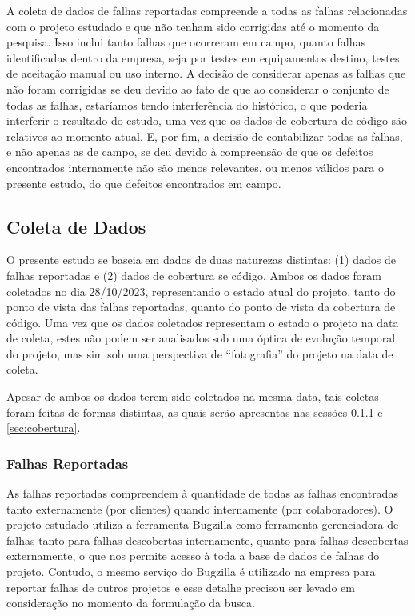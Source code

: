 \documentclass[11.5pt]{article}
\begin{document}
A coleta de dados de falhas reportadas compreende a todas as falhas relacionadas com o projeto
estudado e que não tenham sido corrigidas até o momento da pesquisa.
Isso inclui tanto falhas que ocorreram em campo, quanto falhas identificadas dentro da empresa, seja
por testes em equipamentos destino, testes de aceitação manual ou uso interno.
A decisão de considerar apenas as falhas que não foram corrigidas se deu devido ao fato de que ao
considerar o conjunto de todas as falhas, estaríamos tendo interferência do histórico, o que poderia
interferir o resultado do estudo, uma vez que os dados de cobertura de código são relativos ao
momento atual.
E, por fim, a decisão de contabilizar todas as falhas, e não apenas as de campo, se deu devido à
compreensão de que os defeitos encontrados internamente não são menos relevantes, ou menos válidos
para o presente estudo, do que defeitos encontrados em campo.


\subsection{Coleta de Dados}

O presente estudo se baseia em dados de duas naturezas distintas: (1) dados de falhas reportadas e
(2) dados de cobertura se código.
Ambos os dados foram coletados no dia 28/10/2023, representando o estado atual do projeto, tanto
do ponto de vista das falhas reportadas, quanto do ponto de vista da cobertura de código.
Uma vez que os dados coletados representam o estado o projeto na data de coleta, estes não podem
ser analisados sob uma óptica de evolução temporal do projeto, mas sim sob uma perspectiva de
``fotografia'' do projeto na data de coleta.

Apesar de ambos os dados terem sido coletados na mesma data, tais coletas foram feitas de formas
distintas, as quais serão apresentas nas sessões \ref{sec:falhasReportadas} e \ref{sec:cobertura}.

\subsubsection{Falhas Reportadas} \label{sec:falhasReportadas}

As falhas reportadas compreendem à quantidade de todas as falhas encontradas tanto externamente
(por clientes) quando internamente (por colaboradores).
O projeto estudado utiliza a ferramenta Bugzilla como ferramenta gerenciadora de falhas tanto para
falhas descobertas internamente, quanto para falhas descobertas externamente, o que nos permite
acesso à toda a base de dados de falhas do projeto.
Contudo, o mesmo serviço do Bugzilla é utilizado na empresa para reportar falhas de outros projetos
e esse detalhe precisou ser levado em consideração no momento da formulação da busca.
\end{document}
